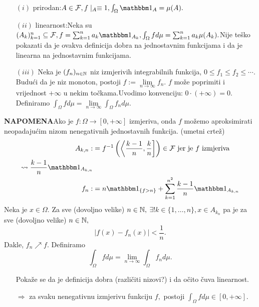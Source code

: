 \documentclass{article}
\begin{document}
\begin{enumerate}
    \item[\((i)\)] prirodan:\newline \(A\in\mathcal F,f\mid_A\equiv 1,\int_\Omega\mathbbm 1_A=\mu(A).\)
    \item[\((ii)\)] linearnost:\newline Neka su \((A_k)_{k=1}^n\subseteq\mathcal F,f=\sum_{k=1}^na_k\mathbbm 1_{A_k}, \int_\Omega fd\mu=\sum_{k=1}^na_k\mu(A_k).\)\newline Nije teško pokazati da je ovakva definicija dobra na jednostavnim funkcijama i da je linearna na jednostavnim funkcijama.
    \item[\((iii)\)] Neka je \((f_n)_{n\in\Bbb N}\) niz izmjerivih integrabilnih funkcija, \(0\le f_1\le f_2\le\cdots.\) Budući da je niz monoton, postoji \(f:=\lim\limits_{n\to\infty}f_n.\) \(f\) može poprimiti i vrijednost \(+\infty\) u nekim točkama.\newline Uvodimo konvenciju: \(0\cdot(+\infty)=0.\)\newline Definiramo \(\int_\Omega fd\mu=\lim\limits_{n\to\infty}\int_\Omega f_nd\mu.\) 
\end{enumerate}
\textbf{NAPOMENA}\newline Ako je \(f:\Omega\to[0,+\infty]\) izmjeriva, onda \(f\) možemo aproksimirati neopadajućim nizom nenegativnih jednostavnih funkcija. (umetni crtež)
\[\begin{aligned}A_{k,n}:&=f^{-1}\left(\left\langle\frac{k-1}n,\frac{k}n\right]\right)\in\mathcal F\text{ jer je }f\text{ izmjeriva}\\\rightsquigarrow\frac{k-1}n\mathbbm 1_{A_{k,n}}&\\f_n:&=n\mathbbm 1_{\{f>n\}}+\sum_{k=1}^{n^2}\frac{k-1}n\mathbbm 1_{A_{k,n}}\end{aligned}\] Neka je \(x\in\Omega.\) Za sve (dovoljno velike) \(n\in\Bbb N,\) \(\exists !k\in\{1,\ldots,n\}, x\in A_{k_n}\) pa je za sve (dovoljno velike) \(n\in\Bbb N,\) \[|f(x)-f_n(x)|<\frac1n.\] Dakle, \(f_n\nearrow f.\)\newline\newline 
Definiramo \[\int_\Omega fd\mu=\lim_{n\to\infty}\int_\Omega f_nd\mu.\]
\begin{itemize}
    \item[\ding{228}] Pokaže se da je definicija dobra (različiti nizovi?) i da očito čuva linearnost.
    \item[] \(\Rightarrow\) za svaku nenegativnu izmjerivu funkciju \(f,\) postoji \(\int_\Omega fd\mu\in[0,+\infty].\) 
\end{itemize}
\end{document}
